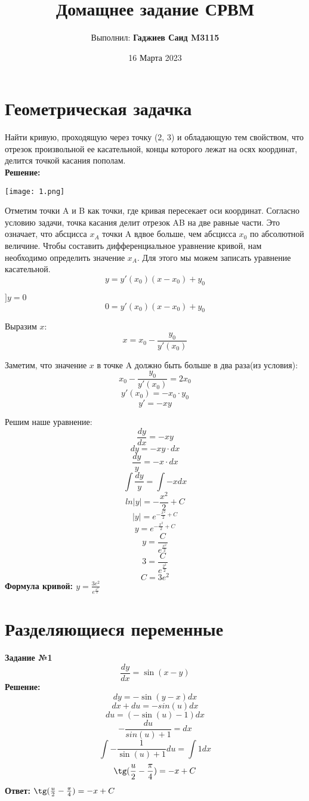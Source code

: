 \documentclass{article}
\title{Домащнее задание СРВМ}
\author{Выполнил: \textbf{Гаджиев Саид M3115}}
\date{16 Марта 2023}
\begin{document}
\maketitle

\section{Геометрическая задачка}
\par{Найти кривую, проходящую через точку (2, 3) и обладающую тем свойством, что отрезок произвольной ее касательной, концы которого лежат на осях координат, делится точкой касания пополам.}\\
\textbf{Решение:}
\begin{center}
    \texttt{[image: 1.png]}
\end{center}
\par{Отметим точки A и B как точки, где кривая пересекает оси координат. Согласно условию задачи, точка касания делит отрезок AB на две равные части. Это означает, что абсцисса $x_{A}$ точки A вдвое больше, чем абсцисса $x_{0}$ по абсолютной величине. Чтобы составить дифференциальное уравнение кривой, нам необходимо определить значение $x_{A}$. Для этого мы можем записать уравнение касательной.}
$$y = y'(x_{0})(x-x_{0})+y_{0}$$
\par{$]y=0$}
$$0 = y'(x_{0})(x-x_{0})+y_{0}$$
\par{Выразим $x$:}
$$x=x_{0} - \frac{y_{0}}{y'(x_{0})}$$
\par{Заметим, что значение $x$ в точке A должно быть больше в два раза(из условия):}
$$x_{0} - \frac{y_{0}}{y'(x_{0})} = 2x_{0}$$
$$y'(x_{0}) = -x_{0} \cdot y_{0}$$
$$y' = -xy$$
\par{Решим наше уравнение:}
$$\frac{dy}{dx} = -xy$$
$$dy = -xy \cdot dx$$
$$\frac{dy}{y} = -x \cdot dx$$
$$\int{\frac{dy}{y}} = \int{-xdx}$$
$$ln|y| = -\frac{x^2}{2} + C$$
$$|y| = e^{-\frac{x^2}{2} + C}$$
$$y = e^{-\frac{x^2}{2} + C}$$
$$y = \frac{C}{e^{\frac{x^2}{2}}}$$
$$3 = \frac{C}{e^{\frac{2^2}{2}}}$$
$$C = 3e^2$$
\textbf{Формула кривой: $y = \frac{3e^2}{e^{\frac{x^2}{2}}}$}

\section{Разделяющиеся переменные}

\textbf{Задание №1}
$$\frac{dy}{dx} = \sin(x-y)$$
\textbf{Решение:}
$$dy = -\sin(y - x)dx$$
$$dx + du = -sin(u)dx$$
$$du = (-\sin(u) - 1)dx$$
$$-\frac{du}{sin(u) + 1} = dx$$
$$\int-\frac{1}{\sin(u)+1}du = \int1dx$$
$$\tg({\frac{u}{2} - \frac{\pi}{4}}) = -x + C$$
\textbf{Ответ: $\tg({\frac{u}{2} - \frac{\pi}{4}}) = -x + C$}\\\\
\end{document}
